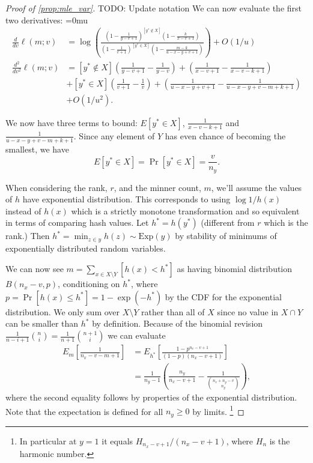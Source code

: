 \begin{proof}[Proof of \cref{prop:mle_var}]
   TODO: Update notation
   We can now evaluate the first two derivatives:
   {
      \thinmuskip=0mu
   \begin{align}
      \frac{d}{dv}\ell(m;v)&=
      \log\left(\frac{(1-\frac1{y-v+1})^{[y^*\not\in X]}(1-\frac{k}{x-v+1})}{(1-\frac 1{v+1})^{[y^*\in X]}(1-\frac{m-k}{u-x-y+v+1})}\right) + O(1/u)
      \label{eq:deriv1}
      \\
      \frac{d^2}{dv^2}\ell(m;v)&=
       [y^*\not\in X](\tfrac1{y-v+1}-\tfrac1{y-v})
      + (\tfrac1{x-v+1}-\tfrac1{x-v-k+1})
                               \\&
                               +[y^*\in X](\tfrac1{v+1}-\tfrac1{v})
      + (\tfrac1{u-x-y+v+1}-\tfrac1{u-x-y+v-m+k+1}) \\&+ O(1/u^2)
      \label{eq:deriv2}
      .
   \end{align}
   \vspace{-1em}
   }

   We now have three terms to bound:
   $E[y^* \in X]$, $\tfrac1{x-v-k+1}$ and $\tfrac1{u-x-y+v-m+k+1}$.
   Since any element of $Y$ has even chance of becoming the smallest, we have 
   \[E[y^*\in X] = \Pr[y^*\in X] = \frac{v}{n_y}. \]

   When considering the rank, $r$, and the minner count, $m$, we'll assume the values of $h$ have exponential distribution.
   This corresponds to using $\log1/h(x)$ instead of $h(x)$ which is a strictly monotone transformation and so equivalent in terms of comparing hash values.
   Let $h^* = h(y^*)$ (different from $r$ which is the rank.)
   Then $h^* = \min_{z\in y}h(z) \sim \text{Exp}(y)$ by stability of minimums of exponentially distributed random variables.

   We can now see $m=\sum_{x\in X\setminus Y} [h(x) < h^*]$ as having binomial distribution $B(n_x-v, p)$, conditioning on $h^*$, where $p=\Pr[h(x)\le h^*] = 1-\exp(-h^*)$ by the CDF for the exponential distribution.
   We only sum over $X\setminus Y$ rather than all of $X$ since no value in $X\cap Y$ can be smaller than $h^*$ by definition.
   Because of the binomial revision
   $\frac1{n-i+1}\binom{n}{i} = \frac1{n+1}\binom{n+1}{i}$
   we can evaluate
   \begin{align}
      E_m\left[\tfrac1{n_x-v-m+1}\right]
      &= E_{h^*}\left[\tfrac{1-p^{n_x-v+1}}{(1-p)(n_x-v+1)}\right]
    \\&= \tfrac1{n_y-1}\left(\tfrac{n_y}{n_x-v+1} - \tfrac1{\binom{n_x+n_y-v}{n_y}}\right),
   \end{align}
   where the second equality follows by properties of the exponential distribution.
   Note that the expectation is defined for all $n_y\ge 0$ by limits.%
   \footnote{In particular at $y=1$ it equals $H_{n_x-v+1}/(n_x-v+1)$, where $H_n$ is the harmonic number.}


\end{proof}
